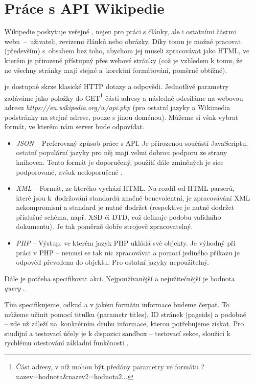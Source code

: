 \section{Práce s API Wikipedie}
Wikipedie poskytuje veřejné , nejen pro práci s články, ale i ostatními částmi webu~--~uživateli, revizemi článků nebo obrázky. Díky tomu je možné pracovat (především) s~obsahem bez toho, abychom jej museli zpracovávat jako HTML, ve kterém je přirozeně přístupný přes webové stránky (což je vzhledem k tomu, že ne všechny stránky mají stejné a~korektní formátování, poměrně obtížné).

 je dostupné skrze klasické HTTP dotazy a odpovědi. Jednotlivé parametry zadáváme jako položky do GET\footnote{Část adresy, v níž mohou být předány parametry ve formátu ?nazev=hodnota\&nazev2=hodnota2...} části adresy a následně odesíláme na webovou adresu \textit{https://en.wikipedia.org/w/api.php} (pro ostatní jazyky a Wikimedia podstránky na stejné adrese, pouze s jinou doménou). Můžeme si však vybrat formát, ve kterém nám server bude odpovídat.
\begin{itemize}
	\item \textit{JSON} -- Preferovaný způsob práce s API. Je přirozenou součástí JavaScriptu, ostatní populární jazyky pro něj mají velmi dobrou podporu ze strany knihoven. Tento formát je doporučený, použití dále zmíněných je sice podporované, avšak nedoporučené \cite{wikiformats}.
	\item \textit{XML} -- Formát, ze kterého vychází HTML. Na rozdíl od HTML parserů, které jsou k~dodržování standardů značně benevolentní, je zpracovávání XML nekompromisní a standard je nutné dodržet (respektive je nutné dodržet příslušné schéma, např. XSD či DTD, což definuje podobu validního dokumentu). Je tak poměrně dobře strojově zpracovatelný.
	\item \textit{PHP} -- Výstup, ve kterém jazyk PHP ukládá své objekty. Je výhodný při práci v PHP -- nemusí se tak nic zpracovávat a pomocí jediného příkazu je odpověď převedena do objektu. Pro ostatní jazyky nepoužitelný.
\end{itemize}

Dále je potřeba specifikovat akci. Nejpoužívanější a nejužitečnější je hodnota \textit{query} \cite{wikiapi}.

Tím specifikujeme, odkud a v jakém formátu informace budeme čerpat. To můžeme učinit pomocí titulku (parametr titles), ID stránek (pageids) a podobně -- zde už záleží na~konkrétním druhu informace, kterou potřebujeme získat. Pro studijní a testovací účely je k dispozici sandbox -- testovací sekce, sloužící k rychlému otestování základní funkčnosti \cite{wikiapisandbox}.

